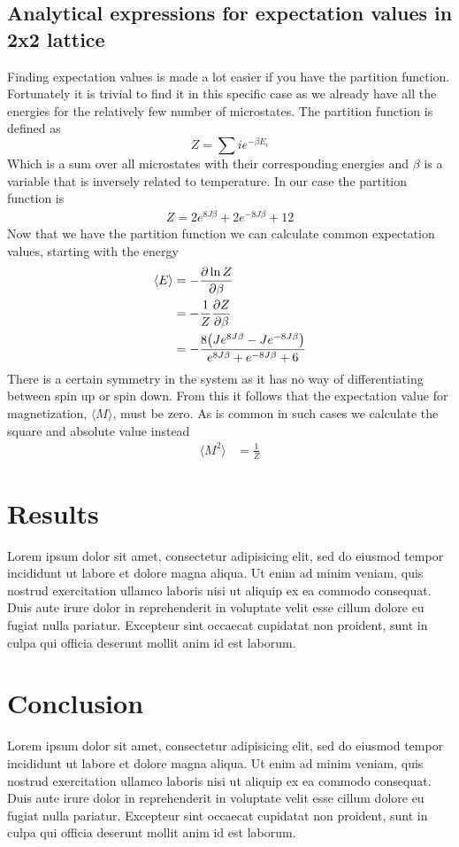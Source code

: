 \documentclass[a4paper, 12pt]{article}
\begin{document}
\subsection{Analytical expressions for expectation values in 2x2 lattice}
	Finding expectation values is made a lot easier if you have the partition function. Fortunately it is trivial to find it in this specific case as we already have all the energies for the relatively few number of microstates. The partition function is defined as
	\begin{equation}
		Z = \sum{i}e^{-\beta E_i}
	\end{equation}
	Which is a sum over all microstates with their corresponding energies and $\beta$ is a variable that is inversely related to temperature. In our case the partition function is
	\begin{align*}
		Z = 2e^{8J\beta}+2e^{-8J\beta}+12
	\end{align*}
	Now that we have the partition function we can calculate common expectation values, starting with the energy
	\begin{align*}
		\langle E \rangle & = - \pdv{\ln{Z}}{\beta}\\
		& = - \frac{1}{Z} \pdv{Z}{\beta} \\
		&= - \frac{8\qty(Je^{8J\beta}-Je^{-8J\beta})}{e^{8J\beta} + e^{-8J\beta} + 6}
	\end{align*}
	There is a certain symmetry in the system as it has no way of differentiating between spin up or spin down. From this it follows that the expectation value for magnetization, $\langle M \rangle$, must be zero. As is common in such cases we calculate the square and absolute value instead
	\begin{align*}
		\langle M^2 \rangle & = \tfrac{1}{Z} 
	\end{align*}
	\newpage

\section{Results}
	Lorem ipsum dolor sit amet, consectetur adipisicing elit, sed do eiusmod
	tempor incididunt ut labore et dolore magna aliqua. Ut enim ad minim veniam,
	quis nostrud exercitation ullamco laboris nisi ut aliquip ex ea commodo
	consequat. Duis aute irure dolor in reprehenderit in voluptate velit esse
	cillum dolore eu fugiat nulla pariatur. Excepteur sint occaecat cupidatat non
	proident, sunt in culpa qui officia deserunt mollit anim id est laborum.

	\newpage

\section{Conclusion}
	Lorem ipsum dolor sit amet, consectetur adipisicing elit, sed do eiusmod
	tempor incididunt ut labore et dolore magna aliqua. Ut enim ad minim veniam,
	quis nostrud exercitation ullamco laboris nisi ut aliquip ex ea commodo
	consequat. Duis aute irure dolor in reprehenderit in voluptate velit esse
	cillum dolore eu fugiat nulla pariatur. Excepteur sint occaecat cupidatat non
	proident, sunt in culpa qui officia deserunt mollit anim id est laborum.
\end{document}
